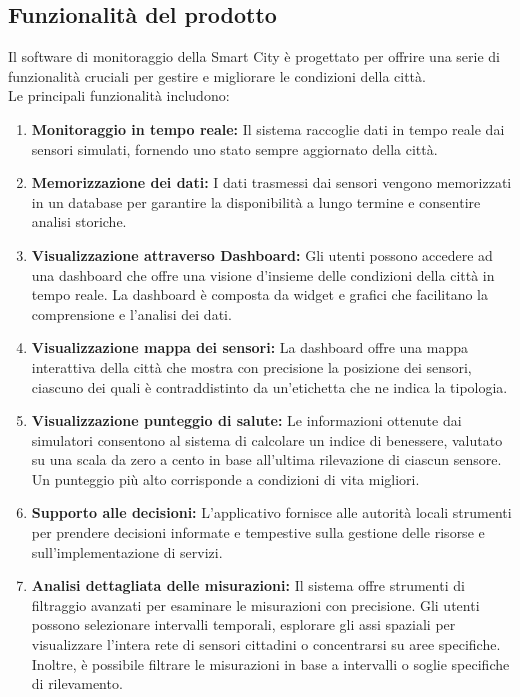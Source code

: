 \subsection{Funzionalità del prodotto}

Il software di monitoraggio della Smart City è progettato per offrire una serie di funzionalità cruciali per gestire e migliorare le condizioni della città. \\
Le principali funzionalità includono:

\begin{enumerate}
    \item \textbf{Monitoraggio in tempo reale:} Il sistema raccoglie dati in tempo reale dai sensori simulati, fornendo uno stato sempre aggiornato della città.

    \item \textbf{Memorizzazione dei dati:} I dati trasmessi dai sensori vengono memorizzati in un database per garantire la disponibilità a lungo termine e consentire analisi storiche.

    \item \textbf{Visualizzazione attraverso Dashboard:} Gli utenti possono accedere ad una dashboard che offre una visione d’insieme delle condizioni della città in tempo reale. La dashboard è composta da widget e grafici che facilitano la comprensione e l'analisi dei dati.
    
    \item \textbf{Visualizzazione mappa dei sensori:} La dashboard offre una mappa interattiva della città che mostra con precisione la posizione dei sensori, ciascuno dei quali è contraddistinto da un'etichetta che ne indica la tipologia.

    \item \textbf{Visualizzazione punteggio di salute:} Le informazioni ottenute dai simulatori consentono al sistema di calcolare un indice di benessere, valutato su una scala da zero a cento in base all'ultima rilevazione di ciascun sensore. Un punteggio più alto corrisponde a condizioni di vita migliori.

    \item \textbf{Supporto alle decisioni:} L'applicativo fornisce alle autorità locali strumenti per prendere decisioni informate e tempestive sulla gestione delle risorse e sull'implementazione di servizi.
    
    \item \textbf{Analisi dettagliata delle misurazioni:} Il sistema offre strumenti di filtraggio avanzati per esaminare le misurazioni con precisione. Gli utenti possono selezionare intervalli temporali, esplorare gli assi spaziali per visualizzare l'intera rete di sensori cittadini o concentrarsi su aree specifiche. Inoltre, è possibile filtrare le misurazioni in base a intervalli o soglie specifiche di rilevamento.
    

\end{enumerate}
